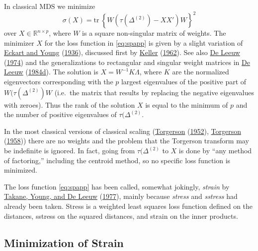 \documentclass[
  12pt,
]{book}
\theoremstyle{definition}
\theoremstyle{definition}
\theoremstyle{definition}
\theoremstyle{definition}
\theoremstyle{remark}
\begin{document}
In classical MDS we minimize
\begin{equation}
\sigma(X)=\text{tr}\ \left\{W(\tau(\Delta^{(2)})-XX')W\right\}^2
\label{eq:spapp}
\end{equation}
over \(X\in\mathbb{R}^{n\times p}\), where \(W\) is a square non-singular matrix of weights.
The minimizer \(X\) for the loss function in \eqref{eq:spapp} is given by a slight variation of \protect\hyperlink{ref-eckart_young_36}{Eckart and Young} (\protect\hyperlink{ref-eckart_young_36}{1936}), discussed first by \protect\hyperlink{ref-keller_62}{Keller} (\protect\hyperlink{ref-keller_62}{1962}). See also \protect\hyperlink{ref-deleeuw_R_74c}{De Leeuw} (\protect\hyperlink{ref-deleeuw_R_74c}{1974}) and the generalizations to rectangular and singular weight matrices in \protect\hyperlink{ref-deleeuw_A_84b}{De Leeuw} (\protect\hyperlink{ref-deleeuw_A_84b}{1984d}). The solution is \(X=W^{-1}K\Lambda\), where \(K\) are the normalized eigenvectors corresponding with the \(p\) largest eigenvalues of the positive part of \(W(\tau(\Delta^{(2)})W\) (i.e.~the matrix that results by replacing the negative eigenvalues with zeroes). Thus the rank of the solution \(X\) is equal to the minimum of \(p\) and the number of positive eigenvalues of \(\tau(\Delta^{(2)}\).

In the most classical versions of classical scaling (\protect\hyperlink{ref-torgerson_52}{Torgerson} (\protect\hyperlink{ref-torgerson_52}{1952}), \protect\hyperlink{ref-torgerson_58}{Torgerson} (\protect\hyperlink{ref-torgerson_58}{1958})) there are no weights and the problem that the Torgerson transform may be indefinite is ignored. In fact, going from \(\tau(\Delta^{(2)}\) to \(X\) is done by ``any method of factoring,'' including the centroid method, so no specific loss function is minimized.

The loss function \eqref{eq:spapp} has been called, somewhat jokingly, \emph{strain} by \protect\hyperlink{ref-takane_young_deleeuw_A_77}{Takane, Young, and De Leeuw} (\protect\hyperlink{ref-takane_young_deleeuw_A_77}{1977}), mainly because \emph{stress} and \emph{sstress} had already been taken. Stress is a weighted least squares loss function defined on the distances,
sstress on the squared distances, and strain on the inner products.

\hypertarget{minimization-of-strain}{%
\subsection{Minimization of Strain}\label{minimization-of-strain}}
\end{document}
